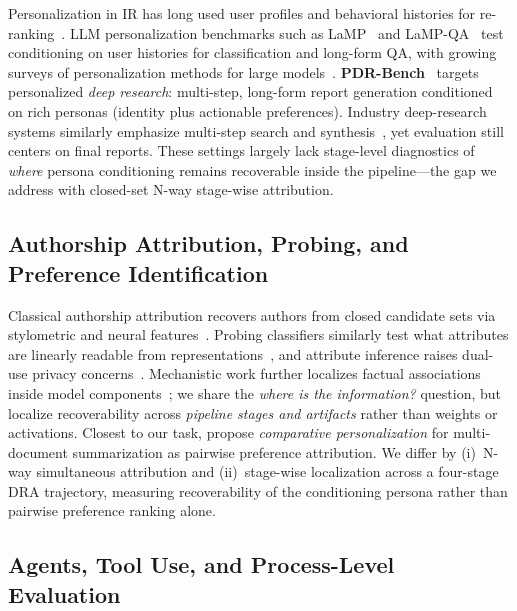 \documentclass[]{article}
\begin{document}
Personalization in IR has long used user profiles and behavioral histories for
re-ranking~\cite{teevan-etal-2005-personalizing,robertson2009bm25}.
LLM personalization benchmarks such as LaMP~\cite{lamp} and
LaMP-QA~\cite{lamp-qa} test conditioning on user histories for classification
and long-form QA, with growing surveys of personalization methods for large
models~\cite{zhang2024personalization-survey,salemi2024optimization,richardson2023integrating}.
\textbf{PDR-Bench}~\cite{pdr-bench} targets personalized \emph{deep research}:
multi-step, long-form report generation conditioned on rich personas (identity
plus actionable preferences).
Industry deep-research systems similarly emphasize multi-step search and
synthesis~\cite{openai2025deepresearch,google2024gemini-deepresearch}, yet
evaluation still centers on final reports.
These settings largely lack stage-level diagnostics of \emph{where} persona
conditioning remains recoverable inside the pipeline---the gap we address
with closed-set N-way stage-wise attribution.

\subsection{Authorship Attribution, Probing, and Preference Identification}

Classical authorship attribution recovers authors from closed candidate
sets via stylometric and neural
features~\cite{stamatatos2009survey,shrestha-etal-2017-convolutional,rivera-soto-etal-2021-learning}.
Probing classifiers similarly test what attributes are linearly readable from
representations~\cite{conneau2018you,belinkov2022probing}, and attribute
inference raises dual-use privacy
concerns~\cite{pan2020privacy}.
Mechanistic work further localizes factual associations inside model
components~\cite{geva2021transformer,meng2022locating}; we share the
\emph{where is the information?} question, but localize recoverability across
\emph{pipeline stages and artifacts} rather than weights or activations.
Closest to our task, \citet{authormap} propose \emph{comparative
personalization} for multi-document summarization as pairwise preference
attribution.
We differ by (i)~N-way simultaneous attribution and
(ii)~stage-wise localization across a four-stage DRA trajectory, measuring
recoverability of the conditioning persona rather than pairwise preference
ranking alone.

\subsection{Agents, Tool Use, and Process-Level Evaluation}
\end{document}
